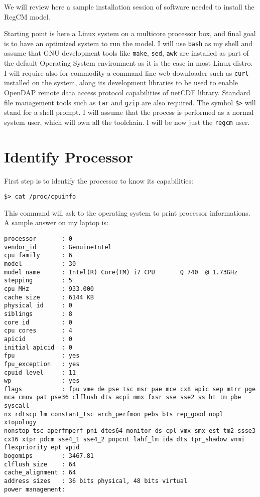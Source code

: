 %
%

We will review here a sample installation session of software needed to
install the RegCM model.

Starting point is here a Linux system on a multicore processor box, and final
goal is to have an optimized system to run the model.
I will use \verb=bash= as my shell and assume that GNU development tools like
\verb=make=, \verb=sed=, \verb=awk= are installed as part of the default
Operating System environment as it is the case in most Linux distro.
I will require also for commodity a command line web downloader such as
\verb=curl= installed on the system, along its development libraries to be
used to enable OpenDAP remote data access protocol capabilities of netCDF
library. Standard file management tools such as \verb=tar= and \verb=gzip=
are also required.
The symbol \verb=$>= will stand for a shell prompt.
I will assume that the process is performed as a normal system user, which
will own all the toolchain. I will be now just the \verb=regcm= user.

\section{Identify Processor}

First step is to identify the processor to know its capabilities:

\begin{Verbatim}
$> cat /proc/cpuinfo
\end{Verbatim}

This command will ask to the operating system to print processor informations.
A sample answer on my laptop is:

\begin{Verbatim}
processor       : 0
vendor_id       : GenuineIntel
cpu family      : 6
model           : 30
model name      : Intel(R) Core(TM) i7 CPU       Q 740  @ 1.73GHz
stepping        : 5
cpu MHz         : 933.000
cache size      : 6144 KB
physical id     : 0
siblings        : 8
core id         : 0
cpu cores       : 4
apicid          : 0
initial apicid  : 0
fpu             : yes
fpu_exception   : yes
cpuid level     : 11
wp              : yes
flags           : fpu vme de pse tsc msr pae mce cx8 apic sep mtrr pge
mca cmov pat pse36 clflush dts acpi mmx fxsr sse sse2 ss ht tm pbe syscall
nx rdtscp lm constant_tsc arch_perfmon pebs bts rep_good nopl xtopology
nonstop_tsc aperfmperf pni dtes64 monitor ds_cpl vmx smx est tm2 ssse3
cx16 xtpr pdcm sse4_1 sse4_2 popcnt lahf_lm ida dts tpr_shadow vnmi
flexpriority ept vpid
bogomips        : 3467.81                                                       
clflush size    : 64                                                            
cache_alignment : 64                                                            
address sizes   : 36 bits physical, 48 bits virtual                             
power management:
\end{Verbatim}

